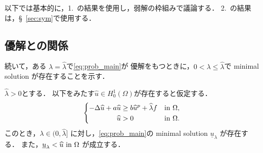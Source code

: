 以下では基本的に，1.~の結果を使用し，弱解の枠組みで議論する．
2.~の結果は，\S~\ref{sec:sym}で使用する．

\subsection{優解との関係}

続いて，ある
$\lambda = \hat{\lambda}$で\ref{eq:prob_main}が
優解をもつときに，$0 < \lambda \leq \hat{\lambda}$で
minimal solution が存在することを示す．

\begin{lem} \label{lem:minimal_itt}
 $\hat{\lambda} > 0$とする．
 以下をみたす$\hat{u} \in H_0^1(\Omega)$が存在すると仮定する．
\begin{align}
 \left\{
 \begin{aligned}
  -\Delta \widehat{u} + a\widehat{u} &\geq b \widehat{u}^p + \widehat{\lambda}f  &
  &\text{in}~ \Omega,  \\
  \widehat{u} &> 0 & &\text{in}~ \Omega.
 \end{aligned}
 \right. \label{eq:prob_lem_ifthm2}
\end{align}
 このとき，$\lambda \in (0,\hat{\lambda} ]$
 に対し，\ref{eq:prob_main}の minimal solution $\underline{u}_\lambda$
 が存在する．
 また，$\underline{u}_\lambda < \widehat{u} ~\text{in}~ \Omega$
 が成立する．
\end{lem}

